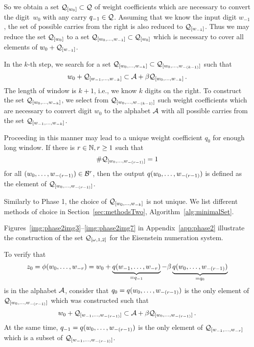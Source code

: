     So we obtain a set $\mathcal{Q}_{[w_0]}\subset\mathcal{Q}$ of weight coefficients which are necessary to convert the digit~$w_0$ with any carry $q_{-1}\in\mathcal{Q}$. Assuming that we know the input digit $w_{-1}$, the set of possible carries from the right is also reduced to $\mathcal{Q}_{[w_{-1}]}$. Thus we may reduce the set $\mathcal{Q}_{[w_0]}$ to a set $\mathcal{Q}_{[w_{0}, \dots, w_{-1}]}\subset \mathcal{Q}_{[w_0]}$ which is necessary to cover all elements of $w_0 + \mathcal{Q}_{[w_{-1}]}$. 

In the $k$-th step, we search for a set $\mathcal{Q}_{[w_{0}, \dots, w_{-k}]}\subset\mathcal{Q}_{[w_{0}, \dots, w_{-(k-1)}]}$ such that 
               $$
              w_0 + \mathcal{Q}_{[w_{-1}, \dots, w_{-k}]} \subset \mathcal{A} + \beta \mathcal{Q}_{[w_{0}, \dots, w_{-k}]}\,.
              $$
              The length of window is $k+1$, i.e., we know $k$ digits on the right. To  construct the set $\mathcal{Q}_{[w_{0}, \dots, w_{-k}]}$, we select from $\mathcal{Q}_{[w_{0}, \dots, w_{-(k-1)}]}$ such weight coefficients which are necessary to convert digit $w_0$ to the alphabet $\mathcal{A}$ with all possible carries from the set $\mathcal{Q}_{[w_{-1}, \dots, w_{-k}]}$.
                 
    Proceeding in this manner may lead to a unique weight coefficient $q_0$ for enough long window.     
    If there is $r\in\mathbb{N}, r\geq 1$ such that 
    $$
    \#\mathcal{Q}_{[w_{0}, \dots, w_{-(r-1)}]}=1
    $$
    for all $(w_{0}, \dots, w_{-(r-1)}) \in \mathcal{B}^r$, then the output $q(w_{0}, \dots, w_{-(r-1)})$ is defined as the element of $\mathcal{Q}_{[w_{0}, \dots, w_{-(r-1)}]}$. 
    
    Similarly to Phase 1, the choice of $\mathcal{Q}_{[w_{0}, \dots, w_{-k}]}$ is not unique. We list different methods of choice in Section~\ref{sec:methodsTwo}, Algorithm~\ref{alg:minimalSet}.
    
    Figures~\ref{img:phase2img3}--\ref{img:phase2img7} in Appendix~\ref{app:phase2} illustrate the construction of the set $\mathcal{Q}_{[\omega,1,2]}$ for the Eisenstein numeration system.
    
        
    To verify that 
$$
	z_0=\phi(w_{0}, \dots, w_{-r})=w_0+ \underbrace{q(w_{-1}, \dots, w_{-r})}_{=q_{-1}} - \beta \underbrace{q(w_{0}, \dots, w_{-(r-1)})}_{=q_0}
$$    
is in the alphabet $\mathcal{A}$, consider that $q_0=q(w_{0}, \dots, w_{-(r-1)})$ is the only element of $\mathcal{Q}_{[w_{0}, \dots, w_{-(r-1)}]}$ which was constructed such that 
$$
w_0 + \mathcal{Q}_{[w_{-1}, \dots, w_{-(r-1)}]} \subset \mathcal{A} +\beta \mathcal{Q}_{[w_{0}, \dots, w_{-(r-1)}]}\,.
$$
At the same time, $q_{-1}=q(w_{0}, \dots, w_{-(r-1)})$ is the only element of $\mathcal{Q}_{[w_{-1}, \dots, w_{-r}]}$ which is a subset of $\mathcal{Q}_{[w_{-1}, \dots, w_{-(r-1)}]}$.

    

